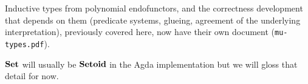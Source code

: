 \documentclass[acmsmall,screen]{acmart}
\begin{document}
\noindent Inductive types from polynomial endofunctors, and the correctness development that
depends on them (predicate systems, glueing, agreement of the underlying interpretation),
previously covered here, now have their own document (\texttt{mu-types.pdf}).

\noindent $\mathbf{Set}$ will usually be $\mathbf{Setoid}$ in the Agda implementation but we will gloss that detail for now.

















\end{document}
